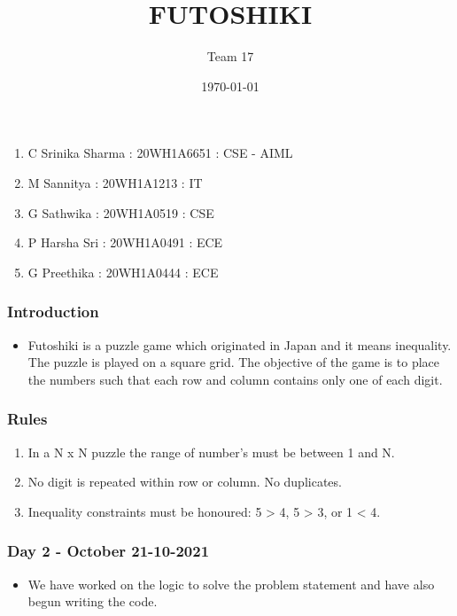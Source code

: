 \documentclass[14pt]{beamer}
\title{FUTOSHIKI}
\subtitle{Team 17}
\date{\today}
\begin{document}
  
  \begin{frame}
        \titlepage
    \end{frame}
  \begin{frame}
	\begin{enumerate}
		\item C Srinika Sharma : 20WH1A6651 : CSE - AIML
		\item M Sannitya : 20WH1A1213 : IT 
		\item G Sathwika : 20WH1A0519 : CSE
		\item P Harsha Sri : 20WH1A0491 : ECE
		\item G Preethika : 20WH1A0444 : ECE
	\end{enumerate}
  \end{frame}


  \begin{frame}
	\frametitle{Introduction}
        
	\begin{itemize}
	    \item Futoshiki is a puzzle game which originated in Japan and it means inequality. The puzzle is played on a square grid. The objective of the game is to place the numbers such that each row and column contains only one of each digit.
	\end{itemize}
	
  \end{frame}
   \begin{frame}
	\frametitle{Rules}

	\begin{enumerate}
	    \item In a N x N puzzle the range of number's must be between 1 and N.  
	    \item No digit is repeated within row or column. No duplicates. 
	    \item Inequality constraints must be honoured: 5 > 4, 5 > 3, or 1 < 4.
	\end{enumerate}
  \end{frame}
 
   
  \begin{frame}
	\frametitle{Day 2 - October 21-10-2021}
        
	\begin{itemize}
	    \item We have worked on the logic to solve the problem statement and have also begun writing the code. 
	\end{itemize}
	
  \end{frame}
\end{document}

